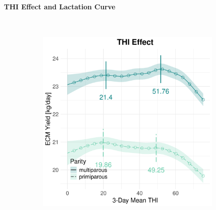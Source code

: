\paragraph{THI Effect and Lactation Curve} \quad \\
\begin{figure}[H]
    \centering
    \begin{subfigure}[b]{0.45\textwidth}
        \centering
        \includegraphics[width=\textwidth]{thesis/figures/models/ecm/before2010/bs_ecm_before2010/bs_ecm_before2010_marginal_thi_milk_combined.png}
    \end{subfigure}
    \hspace{0.05\textwidth} %
    \begin{subfigure}[b]{0.45\textwidth}
        \centering

\end{subfigure}
\end{figure}

